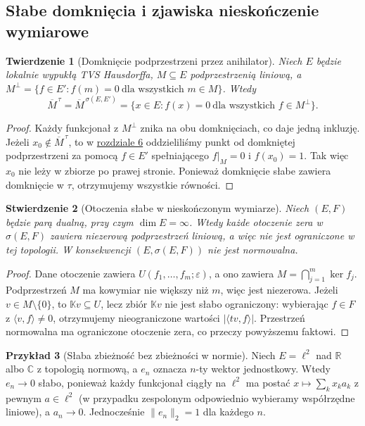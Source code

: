 \documentclass[11pt,a4paper]{article}
\numberwithin{equation}{section}
\theoremstyle{plain}
\newtheorem{twierdzenie}{Twierdzenie}[section]
\newtheorem{stwierdzenie}[twierdzenie]{Stwierdzenie}
\theoremstyle{definition}
\newtheorem{przyklad}[twierdzenie]{Przykład}
\theoremstyle{remark}
\newcommand{\R}{\mathbb R}
\newcommand{\C}{\mathbb C}
\newcommand{\K}{\mathbb K}
\begin{document}
\subsection{Słabe domknięcia i zjawiska nieskończenie wymiarowe}

\begin{twierdzenie}[Domknięcie podprzestrzeni przez anihilator]
\label{thm:anihilator-domkniecie}
Niech $E$ będzie lokalnie wypukłą TVS Hausdorffa,
$M\subseteq E$ podprzestrzenią liniową, a
$M^\perp=\{f\in E': f(m)=0\ \text{dla wszystkich }m\in M\}$.
Wtedy
\[
\overline M^{\,\tau}=\overline M^{\,\sigma(E,E')}
=\{x\in E:f(x)=0\ \text{dla wszystkich }f\in M^\perp\}.
\]
\end{twierdzenie}
\begin{proof}
Każdy funkcjonał z $M^\perp$ znika na obu domknięciach,
co daje jedną inkluzję. Jeżeli $x_0\notin\overline M^{\,\tau}$,
to w \hyperref[sec:hahn-banach]{rozdziale 6} oddzieliliśmy punkt od domkniętej
podprzestrzeni za pomocą $f\in E'$ spełniającego
$f|_M=0$ i $f(x_0)=1$. Tak więc $x_0$ nie leży w
zbiorze po prawej stronie. Ponieważ domknięcie słabe
zawiera domknięcie w $\tau$, otrzymujemy wszystkie równości.
\end{proof}

\begin{stwierdzenie}[Otoczenia słabe w nieskończonym wymiarze]
\label{prop:slabe-otoczenia}
Niech $(E,F)$ będzie parą dualną, przy czym
$\dim E=\infty$. Wtedy każde otoczenie zera w
$\sigma(E,F)$ zawiera niezerową podprzestrzeń liniową,
a więc nie jest ograniczone w tej topologii.
W konsekwencji $(E,\sigma(E,F))$ nie jest normowalna.
\end{stwierdzenie}
\begin{proof}
Dane otoczenie zawiera $U(f_1,\ldots,f_m;\varepsilon)$,
a ono zawiera $M=\bigcap_{j=1}^m\ker f_j$.
Podprzestrzeń $M$ ma kowymiar nie większy niż $m$,
więc jest niezerowa. Jeżeli $v\in M\setminus\{0\}$,
to $\K v\subseteq U$, lecz zbiór $\K v$ nie jest
słabo ograniczony: wybierając $f\in F$ z
$\langle v,f\rangle\ne0$, otrzymujemy nieograniczone
wartości $|\langle tv,f\rangle|$.
Przestrzeń normowalna ma ograniczone otoczenie zera,
co przeczy powyższemu faktowi.
\end{proof}

\begin{przyklad}[Słaba zbieżność bez zbieżności w normie]
Niech $E=\ell^2$ nad $\R$ albo $\C$ z topologią normową,
a $e_n$ oznacza $n$-ty wektor jednostkowy. Wtedy
$e_n\to0$ słabo, ponieważ każdy funkcjonał ciągły na
$\ell^2$ ma postać $x\mapsto\sum_k x_k a_k$
z pewnym $a\in\ell^2$ (w przypadku zespolonym
odpowiednio wybieramy współrzędne liniowe), a $a_n\to0$.
Jednocześnie $\|e_n\|_2=1$ dla każdego $n$.
\end{przyklad}
\end{document}

